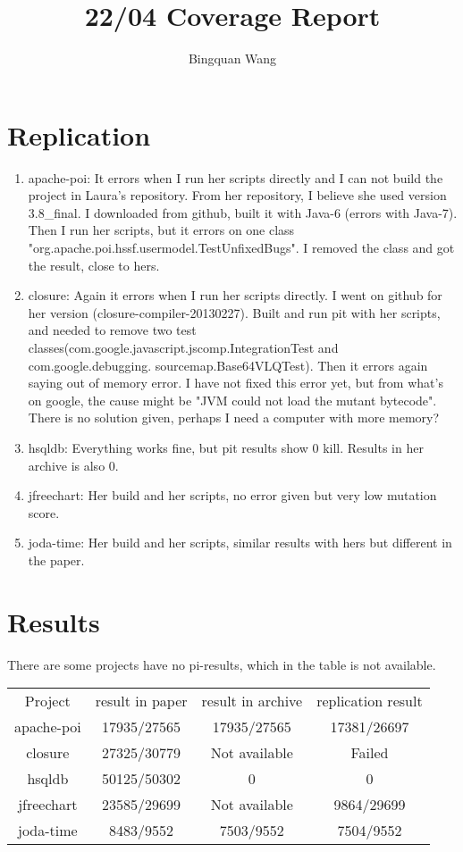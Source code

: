 \documentclass[a4paper]{article}
\title{22/04 Coverage Report}
\author{
Bingquan Wang      
}
\date{}
\begin{document}
       
\maketitle

\section{Replication}
\begin{enumerate}
	\item apache-poi: It errors when I run her scripts directly and I can not build the project in Laura's repository. From her repository, I believe she used version 3.8\_final. I downloaded from github, built it with Java-6 (errors with Java-7). Then I run her scripts, but it errors on one class "org.apache.poi.hssf.usermodel.TestUnfixedBugs". I removed the class and got the result, close to hers.
	
	\item closure: Again it errors when I run her scripts directly. I went on github for her version (closure-compiler-20130227). Built and run pit with her scripts, and needed to remove two test classes(com.google.javascript.jscomp.IntegrationTest and com.google.debugging.
	sourcemap.Base64VLQTest). Then it errors again saying out of memory error. I have not fixed this error yet, but from what's on google, the cause might be "JVM could not load the mutant bytecode". There is no solution given, perhaps I need a computer with more memory?
	
	\item hsqldb: Everything works fine, but pit results show 0 kill. Results in her archive is also 0.
	
	\item jfreechart: Her build and her scripts, no error given but very low mutation score.
	
	\item joda-time: Her build and her scripts, similar results with hers but different in the paper.
\end{enumerate}

\section{Results}
There are some projects have no pi-results, which in the table is not available.


\begin{tabular}{|c|c|c|c|}
	\hline
	Project & result in paper & result in archive & replication result \\
	apache-poi & 17935/27565 & 17935/27565 & 17381/26697 \\
	closure & 27325/30779 & Not available & Failed \\
	hsqldb & 50125/50302 & 0 & 0 \\
	jfreechart & 23585/29699 & Not available & 9864/29699\\
	joda-time & 8483/9552 & 7503/9552 & 7504/9552 \\
	\hline
\end{tabular}
\end{document}
